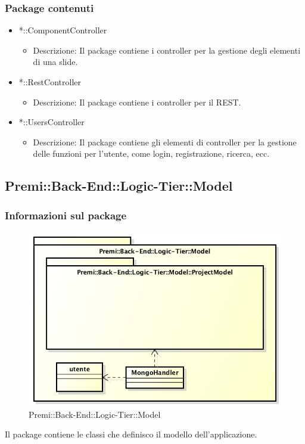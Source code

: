 \subsubsection{Package contenuti}
	\begin{itemize}
		\item *::ComponentController
		\begin{itemize}
			\item Descrizione: Il package contiene i controller per la gestione degli elementi di una slide.
		\end{itemize}
		
		\item *::RestController
		\begin{itemize}
			\item Descrizione: Il package contiene i controller per il REST.
		\end{itemize}
		
		\item *::UsersController
		\begin{itemize}
			\item Descrizione: Il package contiene gli elementi di controller per la gestione delle funzioni per l'utente, come login, registrazione, ricerca, ecc.
		\end{itemize}
	\end{itemize}


\subsection{Premi::Back-End::Logic-Tier::Model}
	\subsubsection{Informazioni sul package}
	\begin{figure}[h]
	\centering
	\includegraphics[width=0.7\linewidth]{img/back-end-logic-tier-model}
	\caption[Premi::Back-End::Logic-Tier::Model]{Premi::Back-End::Logic-Tier::Model}
	\end{figure}
	Il package contiene le classi che definisco il modello dell'applicazione.
	
